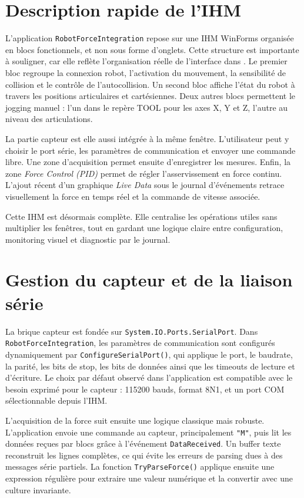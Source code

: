 \documentclass[11pt,a4paper]{article}
\begin{document}
\section{Description rapide de l'IHM}
\label{sec:ihm}
L'application \texttt{RobotForceIntegration} repose sur une IHM WinForms organis\'ee en blocs fonctionnels, et non sous forme d'onglets. Cette structure est importante \`a souligner, car elle refl\`ete l'organisation r\'eelle de l'interface dans . Le premier bloc regroupe la connexion robot, l'activation du mouvement, la sensibilit\'e de collision et le contr\^ole de l'autocollision. Un second bloc affiche l'\'etat du robot \`a travers les positions articulaires et cart\'esiennes. Deux autres blocs permettent le jogging manuel : l'un dans le rep\`ere TOOL pour les axes X, Y et Z, l'autre au niveau des articulations.

La partie capteur est elle aussi int\'egr\'ee \`a la m\^eme fen\^etre. L'utilisateur peut y choisir le port s\'erie, les param\`etres de communication et envoyer une commande libre. Une zone d'acquisition permet ensuite d'enregistrer les mesures. Enfin, la zone \emph{Force Control (PID)} permet de r\'egler l'asservissement en force continu. L'ajout r\'ecent d'un graphique \emph{Live Data} sous le journal d'\'ev\'enements retrace visuellement la force en temps r\'eel et la commande de vitesse associ\'ee.

Cette IHM est d\'esormais compl\`ete. Elle centralise les op\'erations utiles sans multiplier les fen\^etres, tout en gardant une logique claire entre configuration, monitoring visuel et diagnostic par le journal.

\section{Gestion du capteur et de la liaison s\'erie}
\label{sec:capteur}
La brique capteur est fond\'ee sur \texttt{System.IO.Ports.SerialPort}. Dans \texttt{RobotForceIntegration}, les param\`etres de communication sont configur\'es dynamiquement par \texttt{ConfigureSerialPort()}, qui applique le port, le baudrate, la parit\'e, les bits de stop, les bits de donn\'ees ainsi que les timeouts de lecture et d'\'ecriture. Le choix par d\'efaut observ\'e dans l'application est compatible avec le besoin exprim\'e pour le capteur : 115200 bauds, format 8N1, et un port COM s\'electionnable depuis l'IHM.

L'acquisition de la force suit ensuite une logique classique mais robuste. L'application envoie une commande au capteur, principalement \texttt{"M"}, puis lit les donn\'ees re\c{c}ues par blocs gr\^ace \`a l'\'ev\'enement \texttt{DataReceived}. Un buffer texte reconstruit les lignes compl\`etes, ce qui \'evite les erreurs de parsing dues \`a des messages s\'erie partiels. La fonction \texttt{TryParseForce()} applique ensuite une expression r\'eguli\`ere pour extraire une valeur num\'erique et la convertir avec une culture invariante.
\end{document}
